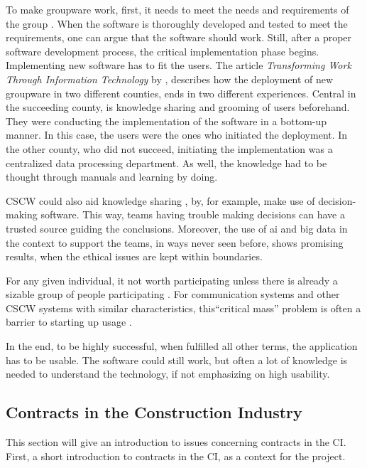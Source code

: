To make groupware work, first, it needs to meet the needs and requirements of the group \cite{subramanyam2010user}. When the software is thoroughly developed and tested to meet the requirements, one can argue that the software should work. Still, after a proper software development process, the critical implementation phase begins. Implementing new software has to fit the users. The article \textit{Transforming Work Through Information Technology} by \cite{Robey&Sahay}, describes how the deployment of new groupware in two different counties, ends in two different experiences. Central in the succeeding county, is knowledge sharing and grooming of users beforehand. They were conducting the implementation of the software in a bottom-up manner. In this case, the users were the ones who initiated the deployment. In the other county, who did not succeed, initiating the implementation was a centralized data processing department. As well, the knowledge had to be thought through manuals and learning by doing.

CSCW could also aid knowledge sharing \cite{monplaisir2002enhancing}, by, for example, make use of decision-making software. This way, teams having trouble making decisions can have a trusted source guiding the conclusions. Moreover, the use of ai and big data in the context to support the teams, in ways never seen before, shows promising results, when the ethical issues  \cite{jung2017computational} are kept within boundaries.   

For any given individual, it not worth participating unless there is already a sizable group of people participating \cite{grudin1989groupware}. For communication systems and other CSCW systems with similar characteristics, this“critical mass” problem is often a barrier to starting up usage \cite{markus1987toward}.

In the end, to be highly successful, when fulfilled all other terms, the application has to be usable. The software could still work, but often a lot of knowledge is needed to understand the technology, if not emphasizing on high usability. 

\subsection{Contracts in the Construction Industry}
This section will give an introduction to issues concerning contracts in the CI. First, a short introduction to contracts in the CI, as a context for the project. 


